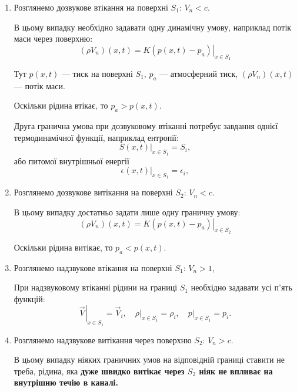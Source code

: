 \begin{enumerate}
	\item Розглянемо дозвукове втікання на поверхні $S_1$: $V_n < c$. \medskip   

	В цьому випадку необхідно задавати одну динамічну умову, наприклад потік маси через поверхню:
	\begin{equation}
		(\rho V_n )(x, t) = K \left. (p(x, t) - p_a) \right|_{x \in S_1}
	\end{equation}

	\begin{remark}
		Тут $p(x, t)$ --- тиск на поверхні $S_1$, $p_a$ --- атмосферний тиск, $(\rho V_n)(x, t)$ --- потік маси.
	\end{remark}

	\begin{remark}
		Оскільки рідина втікає, то $p_a > p(x, t)$.
	\end{remark}

	Друга гранична умова при дозвуковому втіканні потребує завдання однієї термодинамічної функції, наприклад ентропії:
	\begin{equation}
		\left. S(x, t) \right|_{x \in S_1} = S_i,
	\end{equation}
	або питомої внутрішньої енергії
	\begin{equation}
		\left. \epsilon(x, t) \right|_{x \in S_1} = \epsilon_i,
	\end{equation}

	\item Розглянемо дозвукове витікання на поверхні $S_2$: $V_n < c$. \medskip

	В цьому випадку достатньо задати лише одну граничну умову:
	\begin{equation}
		(\rho V_n )(x, t) = K \left. (p(x, t) - p_a) \right|_{x \in S_2}
	\end{equation}

	\begin{remark}
		Оскільки рідина витікає, то $p_a < p(x, t)$.
	\end{remark}

	\item Розглянемо надзвукове втікання на поверхні $S_1$: $V_n > 1$, \medskip

	При надзвуковому втіканні рідини на границі $S_1$ необхідно задавати усі п'ять функцій:
	\begin{equation}
		\left. \vec V \right|_{x \in S_1} = \vec V_i, \quad \left. \rho \right|_{x \in S_1} = \rho_i, \quad \left. p \right|_{x \in S_1} = p_i.
	\end{equation}

	\item Розглянемо надзвукове витікання через поверхню $S_2$: $V_n > c$. \medskip

	В цьому випадку ніяких граничних умов на відповідній границі ставити не треба, рідина, яка \bf{дуже швидко} витікає через $S_2$ ніяк не впливає на внутрішню течію в каналі.
\end{enumerate}

% 